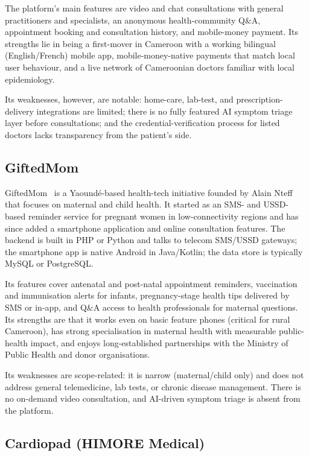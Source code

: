 The platform's main features are video and chat consultations with general practitioners and specialists, an anonymous health-community Q\&A, appointment booking and consultation history, and mobile-money payment. Its strengths lie in being a first-mover in Cameroon with a working bilingual (English/French) mobile app, mobile-money-native payments that match local user behaviour, and a live network of Cameroonian doctors familiar with local epidemiology.

Its weaknesses, however, are notable: home-care, lab-test, and prescription-delivery integrations are limited; there is no fully featured AI symptom triage layer before consultations; and the credential-verification process for listed doctors lacks transparency from the patient's side.

\subsection{GiftedMom}

GiftedMom~\cite{giftedmom} is a Yaound\'e-based health-tech initiative founded by Alain Nteff that focuses on maternal and child health. It started as an SMS- and USSD-based reminder service for pregnant women in low-connectivity regions and has since added a smartphone application and online consultation features. The backend is built in PHP or Python and talks to telecom SMS/USSD gateways; the smartphone app is native Android in Java/Kotlin; the data store is typically MySQL or PostgreSQL.

Its features cover antenatal and post-natal appointment reminders, vaccination and immunisation alerts for infants, pregnancy-stage health tips delivered by SMS or in-app, and Q\&A access to health professionals for maternal questions. Its strengths are that it works even on basic feature phones (critical for rural Cameroon), has strong specialisation in maternal health with measurable public-health impact, and enjoys long-established partnerships with the Ministry of Public Health and donor organisations.

Its weaknesses are scope-related: it is narrow (maternal/child only) and does not address general telemedicine, lab tests, or chronic disease management. There is no on-demand video consultation, and AI-driven symptom triage is absent from the platform.

\subsection{Cardiopad (HIMORE Medical)}

